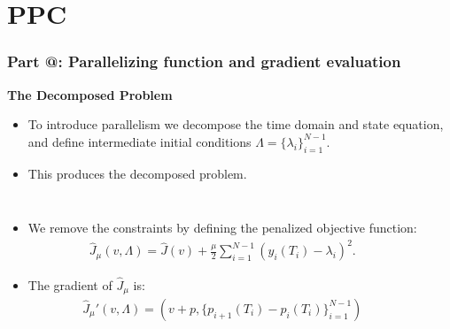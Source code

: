 \documentclass[9pt]{beamer}
\makeatletter
\newcommand*{\rom}[1]{\expandafter\@slowromancap\romannumeral #1@}
\makeatother
\begin{document}
\section{PPC}
\begin{frame}
\frametitle{\textbf{ Part \rom{3}:} Parallelizing function and gradient evaluation}
\textbf{The Decomposed Problem}
\begin{itemize}
\item{To introduce parallelism we decompose the time domain and state equation, and define intermediate initial conditions $\Lambda=\{\lambda_i\}_{i=1}^{N-1}$.}
\item{This produces the decomposed problem.}
\end{itemize}
\begin{columns}
\begin{itemize}
\item<2->{We remove the constraints by defining the penalized objective function:{\small
\begin{align*}
\hat{J}_{\mu}(v,\Lambda) = \hat{J}(v) + \frac{\mu}{2}\sum_{i=1}^{N-1}(y_{i}(T_i)-\lambda_i)^2.
\end{align*}}}
\item<3->{The gradient of $\hat{J}_{\mu}$ is:{\small
\begin{align*}
\hat J_{\mu}'(v,\Lambda) = (v+p,\{p_{i+1}(T_i)-p_{i}(T_i)\}_{i=1}^{N-1})
\end{align*}}}
\end{itemize}
\end{columns}
\end{frame}
\end{document}
